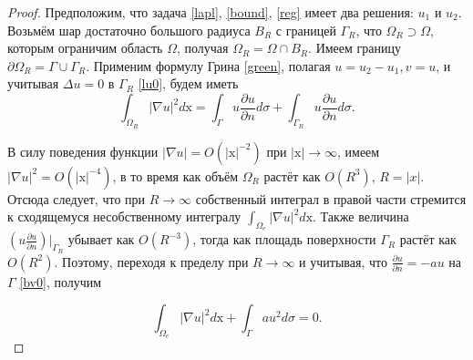     \begin{proof}
        Предположим, что задача \eqref{lapl}, \eqref{bound}, \eqref{reg} имеет два решения: \(u_1\) и \(u_2\). Возьмём шар достаточно большого радиуса \(B_R\) с границей \(\Gamma_R\), что \(\Omega_R \supset \Omega\), которым ограничим область \(\Omega\), получая \(\Omega_R = \Omega \cap B_R\). Имеем границу \( \partial \Omega_R = \Gamma \cup \Gamma_R \). Применим формулу Грина \eqref{green}, полагая \( u = u_2 - u_1, v = u \), и учитывая \(\Delta u = 0\) в \(\Gamma_R\) \eqref{lu0}, будем иметь
        \begin{equation}
            \int_{\Omega_R} | \nabla u |^2 d\mathrm{x} = \int_\Gamma u \frac{\partial u}{\partial n} d\sigma + \int_{\Gamma_R} u \frac{\partial u}{\partial n} d\sigma.
        \end{equation} 
        
        В силу поведения функции \( |\nabla u| = O(|\mathrm{x}|^{-2}) \) при \(|\mathrm{x}| \to \infty \), имеем \( |\nabla u|^2 = O( |\mathrm{x}|^{-4}) \), в то время как объём \(\Omega_R\) растёт как \(O (R^3) \), \(R = |x|\). Отсюда следует, что при \(R \to \infty \) собственный интеграл в правой части стремится к сходящемуся несобственному интегралу \( \int_{\Omega_e} | \nabla u |^2 d\mathrm{x} \). Также величина \( \left( u \frac{\partial u}{\partial n} \right) \big|_{\Gamma_R} \) убывает как \( O( R^{-3}) \), тогда как площадь поверхности \( \Gamma_R \) растёт как \( O(R^2) \). Поэтому, переходя к пределу при \(R \to \infty \) и учитывая, что \( \frac{\partial u}{\partial n} = -au \) на \( \Gamma \) \eqref{bv0}, получим
        
        \begin{equation}
            \int_{\Omega_e} | \nabla u |^2 d\mathrm{x} + \int_\Gamma au^2 d\sigma = 0.
        \end{equation}
        
    \end{proof}